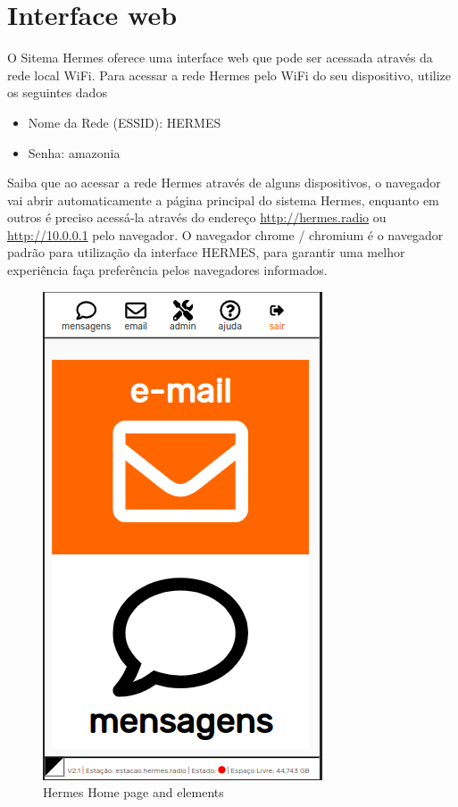 \documentclass[11pt,a4paper]{article}
\begin{document}
\section{Interface web}

O Sitema Hermes oferece uma interface web que pode ser acessada através da rede local WiFi. Para acessar a rede Hermes pelo WiFi do seu dispositivo, utilize os seguintes dados 
\begin{itemize}
    \item Nome da Rede (ESSID): HERMES
    \item Senha: amazonia
\end{itemize}

Saiba que ao acessar a rede Hermes através de alguns dispositivos, o navegador vai abrir automaticamente a página principal do sistema Hermes, enquanto em outros é preciso acessá-la através do endereço \url{http://hermes.radio} ou \url{http://10.0.0.1} pelo navegador.
O navegador chrome / chromium é o navegador padrão para utilização da interface HERMES, para garantir uma melhor experiência faça preferência pelos navegadores informados.

   \begin{figure}[H]
    \centering
    \includegraphics[width=0.5\columnwidth]{screenshots/frontend/pt_kn/landing.png}
    \caption{Hermes Home page and elements}
    \label{fig:interface}
    \end{figure}
    
\end{document}
